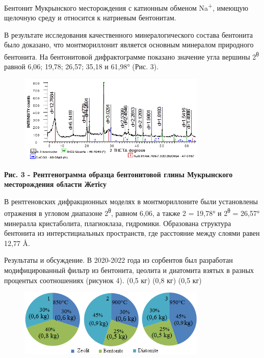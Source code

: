 Бентонит Мукрынского месторождения с катионным обменом
Na\textsuperscript{+}, имеющую щелочную среду и относится к натриевым
бентонитам.

В результате исследования качественного минералогического состава
бентонита было доказано, что монтмориллонит является основным минералом
природного бентонита. На бентонитовой дифрактограмме показано значение
угла вершины 2\textsuperscript{θ} равной 6,06; 19,78; 26,57; 35,18 и
61,98° (Рис. 3).

\begin{figure}[H]
	\centering
	\includegraphics[width=0.8\textwidth]{media/chem/image3}
	\caption*{}
\end{figure}


{\bfseries Рис. 3 - Рентгенограмма образца бентонитовой глины Мукрынского
месторождения области Жетісу}

В рентгеновских дифракционных моделях в монтмориллоните были установлены
отражения в угловом диапазоне 2\textsuperscript{θ}, равном 6,06, а также
2 = 19,78° и 2\textsuperscript{θ} = 26,57° минералла кристаболита,
плагиоклаза, гидромики. Образована структура бентонита из
интерстициальных пространств, где расстояние между слоями равен 12,77 Å.

Результаты и обсуждение. В 2020-2022 года из сорбентов был разработан
модифицированный фильтр из бентонита, цеолита и диатомита взятых в
разных процентых соотношениях (рисунок 4). (0,5 кг) (0,8 кг) (0,5 кг)

\begin{figure}[H]
	\centering
	\includegraphics[width=0.8\textwidth]{media/chem/image4}
	\caption*{}
\end{figure}


